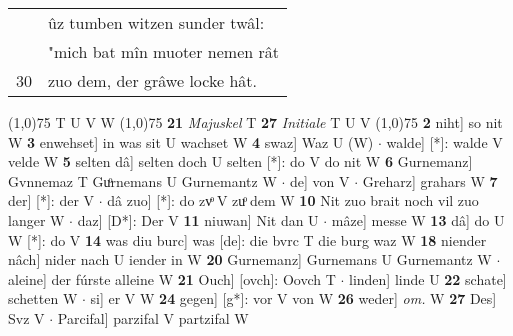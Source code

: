 \documentclass[8pt,a4paper,notitlepage]{article}
\begin{document}
\begin{table}[ht]
\begin{minipage}[t]{0.5\linewidth}
\begin{tabular}{rl}
 & ûz tumben witzen sunder twâl:\\ 
 & "mich bat mîn muoter nemen rât\\ 
30 & zuo dem, der grâwe locke hât.\\ 
\end{tabular}
\scriptsize
\line(1,0){75} \newline
T U V W \newline
\line(1,0){75} \newline
\textbf{21} \textit{Majuskel} T  \textbf{27} \textit{Initiale} T U V  \newline
\line(1,0){75} \newline
\textbf{2} niht] so nit W \textbf{3} enwehset] in was sit U wachset W \textbf{4} swaz] Waz U (W)  $\cdot$ walde] [*]: walde V velde W \textbf{5} selten dâ] selten doch U selten [*]: do V do nit W \textbf{6} Gurnemanz] Gvnnemaz T Guͦrnemans U Gurnemantz W  $\cdot$ de] von V  $\cdot$ Greharz] grahars W \textbf{7} der] [*]: der V  $\cdot$ dâ zuo] [*]: do zvͦ V zuͦ dem W \textbf{10} Nit zuo brait noch vil zuo langer W  $\cdot$ daz] [D*]: Der V \textbf{11} niuwan] Nit dan U  $\cdot$ mâze] messe W \textbf{13} dâ] do U W [*]: do V \textbf{14} was diu burc] was [de]: die bvrc T die burg waz W \textbf{18} niender nâch] nider nach U iender in W \textbf{20} Gurnemanz] Gurnemans U Gurnemantz W  $\cdot$ aleine] der fúrste alleine W \textbf{21} Ouch] [ovch]: Oovch T  $\cdot$ linden] linde U \textbf{22} schate] schetten W  $\cdot$ si] er V W \textbf{24} gegen] [g*]: vor V von W \textbf{26} weder] \textit{om.} W \textbf{27} Des] Svz V  $\cdot$ Parcifal] parzifal V partzifal W \newline
\end{minipage}
\end{table}
\end{document}

